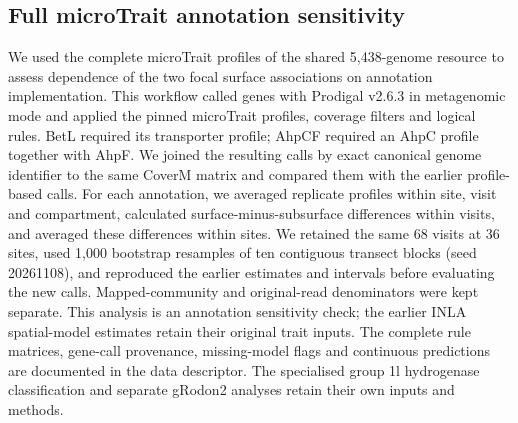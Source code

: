 \subsection*{Full microTrait annotation sensitivity}

We used the complete microTrait profiles of the shared 5,438-genome resource \cite{rubalkhali_datapaper,karaoz2022microtrait} to assess dependence of the two focal surface associations on annotation implementation. This workflow called genes with Prodigal v2.6.3 in metagenomic mode and applied the pinned microTrait profiles, coverage filters and logical rules. BetL required its transporter profile; AhpCF required an AhpC profile together with AhpF. We joined the resulting calls by exact canonical genome identifier to the same CoverM matrix and compared them with the earlier profile-based calls. For each annotation, we averaged replicate profiles within site, visit and compartment, calculated surface-minus-subsurface differences within visits, and averaged these differences within sites. We retained the same 68 visits at 36 sites, used 1,000 bootstrap resamples of ten contiguous transect blocks (seed 20261108), and reproduced the earlier estimates and intervals before evaluating the new calls. Mapped-community and original-read denominators were kept separate. This analysis is an annotation sensitivity check; the earlier INLA spatial-model estimates retain their original trait inputs. The complete rule matrices, gene-call provenance, missing-model flags and continuous predictions are documented in the data descriptor. The specialised group 1l hydrogenase classification and separate gRodon2 analyses retain their own inputs and methods.
